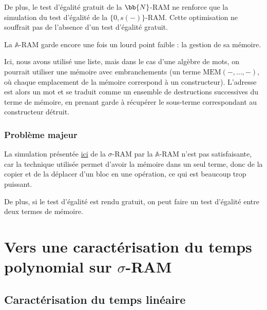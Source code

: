 \documentclass{report}
\newcommand{\bbA}{\mathbb{A}}
\begin{document}
				De plus, le test d'égalité gratuit de la $\bb{N}$-RAM ne renforce que la simulation du test d'égalité de la $\{0,s(-)\}$-RAM. Cette optimisation ne souffrait pas de l'absence d'un test d'égalité gratuit. 
				
				La $\bbA$-RAM garde encore une fois un lourd point faible : la gestion de sa mémoire.
				
				Ici, nous avons utilisé une liste, mais dans le cas d'une algèbre de mots, on pourrait utiliser une mémoire avec embranchements (un terme $\text{MEM}\left( -, \dots, -\right)$, où chaque emplacement de la mémoire correspond à un constructeur). L'adresse est alors un mot et se traduit comme un ensemble de destructions successives du terme de mémoire, en prenant garde à récupérer le sous-terme correspondant au constructeur détruit.
				
				

				\subsubsection{Problème majeur}

				La simulation présentée \hyperref[par:sim_sigma_RAM_A_RAM]{ici} de la $\sigma$-RAM par la $\bbA$-RAM n'est pas satisfaisante, car la technique utilisée permet d'avoir la mémoire dans un seul terme, donc de la copier et de la déplacer d'un bloc en une opération, ce qui est beaucoup trop puissant. 
				
				De plus, si le test d'égalité est rendu gratuit, on peut faire un test d'égalité entre deux termes de mémoire.


	\section{Vers une caractérisation du temps polynomial sur $\sigma$-RAM}
		\label{sec:carac_poly_sigma_RAM}
		
		\subsection{Caractérisation du temps linéaire}
			\label{subsec:carac_lineaire}
			\label{subsec:resume_Grandjean_Schwentick}
			
		\begin{definition}[LSRS]
			
		\end{definition}
			
\end{document}
